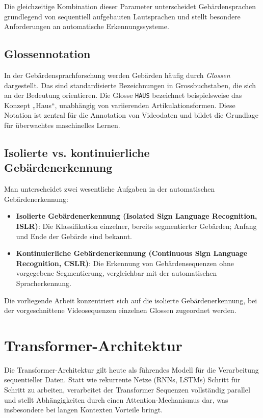 Die gleichzeitige Kombination dieser Parameter unterscheidet Gebärdensprachen grundlegend von sequentiell aufgebauten Lautsprachen und stellt besondere Anforderungen an automatische Erkennungssysteme.

\subsection{Glossennotation}

In der Gebärdensprachforschung werden Gebärden häufig durch \textit{Glossen} dargestellt. Das sind standardisierte Bezeichnungen in Grossbuchstaben, die sich an der Bedeutung orientieren. Die Glosse \texttt{HAUS} bezeichnet beispielsweise das Konzept „Haus“, unabhängig von variierenden Artikulationsformen. Diese Notation ist zentral für die Annotation von Videodaten und bildet die Grundlage für überwachtes maschinelles Lernen.

\subsection{Isolierte vs. kontinuierliche Gebärdenerkennung}

Man unterscheidet zwei wesentliche Aufgaben in der automatischen Gebärdenerkennung:

\begin{itemize}
    \item \textbf{Isolierte Gebärdenerkennung (Isolated Sign Language Recognition, ISLR)}: Die Klassifikation einzelner, bereits segmentierter Gebärden; Anfang und Ende der Gebärde sind bekannt.
    \item \textbf{Kontinuierliche Gebärdenerkennung (Continuous Sign Language Recognition, CSLR)}: Die Erkennung von Gebärdensequenzen ohne vorgegebene Segmentierung, vergleichbar mit der automatischen Spracherkennung.
\end{itemize}

Die vorliegende Arbeit konzentriert sich auf die isolierte Gebärdenerkennung, bei der vorgeschnittene Videosequenzen einzelnen Glossen zugeordnet werden.

\section{Transformer-Architektur}

Die Transformer-Architektur \cite{vaswani2017} gilt heute als führendes Modell für die Verarbeitung sequentieller Daten. Statt wie rekurrente Netze (RNNs, LSTMs) Schritt für Schritt zu arbeiten, verarbeitet der Transformer Sequenzen vollständig parallel und stellt Abhängigkeiten durch einen Attention-Mechanismus dar, was insbesondere bei langen Kontexten Vorteile bringt.

